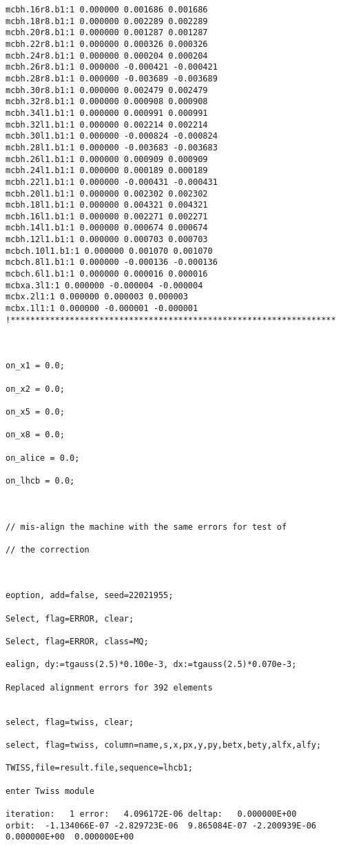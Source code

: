 \begin{verbatim}
mcbh.16r8.b1:1 0.000000 0.001686 0.001686
mcbh.18r8.b1:1 0.000000 0.002289 0.002289
mcbh.20r8.b1:1 0.000000 0.001287 0.001287
mcbh.22r8.b1:1 0.000000 0.000326 0.000326
mcbh.24r8.b1:1 0.000000 0.000204 0.000204
mcbh.26r8.b1:1 0.000000 -0.000421 -0.000421
mcbh.28r8.b1:1 0.000000 -0.003689 -0.003689
mcbh.30r8.b1:1 0.000000 0.002479 0.002479
mcbh.32r8.b1:1 0.000000 0.000908 0.000908
mcbh.34l1.b1:1 0.000000 0.000991 0.000991
mcbh.32l1.b1:1 0.000000 0.002214 0.002214
mcbh.30l1.b1:1 0.000000 -0.000824 -0.000824
mcbh.28l1.b1:1 0.000000 -0.003683 -0.003683
mcbh.26l1.b1:1 0.000000 0.000909 0.000909
mcbh.24l1.b1:1 0.000000 0.000189 0.000189
mcbh.22l1.b1:1 0.000000 -0.000431 -0.000431
mcbh.20l1.b1:1 0.000000 0.002302 0.002302
mcbh.18l1.b1:1 0.000000 0.004321 0.004321
mcbh.16l1.b1:1 0.000000 0.002271 0.002271
mcbh.14l1.b1:1 0.000000 0.000674 0.000674
mcbh.12l1.b1:1 0.000000 0.000703 0.000703
mcbch.10l1.b1:1 0.000000 0.001070 0.001070
mcbch.8l1.b1:1 0.000000 -0.000136 -0.000136
mcbch.6l1.b1:1 0.000000 0.000016 0.000016
mcbxa.3l1:1 0.000000 -0.000004 -0.000004
mcbx.2l1:1 0.000000 0.000003 0.000003
mcbx.1l1:1 0.000000 -0.000001 -0.000001
!******************************************************************



on_x1 = 0.0;

on_x2 = 0.0;

on_x5 = 0.0;

on_x8 = 0.0;

on_alice = 0.0;

on_lhcb = 0.0;



// mis-align the machine with the same errors for test of 

// the correction



eoption, add=false, seed=22021955;

Select, flag=ERROR, clear;

Select, flag=ERROR, class=MQ;

ealign, dy:=tgauss(2.5)*0.100e-3, dx:=tgauss(2.5)*0.070e-3;

Replaced alignment errors for 392 elements


select, flag=twiss, clear;

select, flag=twiss, column=name,s,x,px,y,py,betx,bety,alfx,alfy;

TWISS,file=result.file,sequence=lhcb1; 

enter Twiss module
  
iteration:   1 error:   4.096172E-06 deltap:   0.000000E+00
orbit:  -1.134066E-07 -2.829723E-06  9.865084E-07 -2.200939E-06  0.000000E+00  0.000000E+00
  

\end{verbatim}
